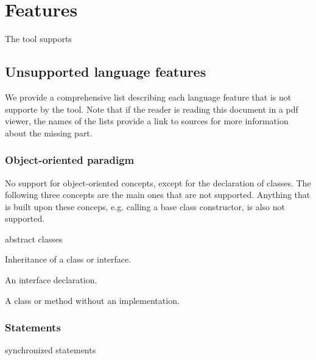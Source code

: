 \chapter{Features}
The tool supports

\section{Unsupported language features}
We provide a comprehensive list describing each language feature that is not 
supporte by the tool. Note that if the reader is reading this document in a pdf 
viewer, the names of the lists provide a link to sources for more information
about the missing part.

\subsection{Object-oriented paradigm}
No support for object-oriented concepts, except for the declaration of classes.
The following three concepts are the main ones that are not supported. Anything
that is built upon these conceps, e.g. calling a base class constructor, is also
not supported.

\begin{labeling}{abstract classes}
\item [\href{https://docs.oracle.com/javase/tutorial/java/concepts/inheritance.html}
            {inheritance}] Inheritance of a class or interface.
\item [\href{https://docs.oracle.com/javase/tutorial/java/concepts/interface.html}
            {interfaces}] An interface declaration.
\item [\href{https://docs.oracle.com/javase/tutorial/java/IandI/abstract.html}
            {abstract classes}] A class or method without an implementation.
\end{labeling} 

\subsection{Statements}
\begin{labeling}{synchronized statements}
\item [\href{https://docs.oracle.com/javase/tutorial/java/nutsandbolts/while.html}
            {do while loops}] 
\item [\href{https://docs.oracle.com/javase/tutorial/java/nutsandbolts/for.html}
            {for iterator loops}] 
\item [\href{https://docs.oracle.com/javase/tutorial/essential/concurrency/locksync.html}
            {synchronized statements}] 
\end{labeling}

